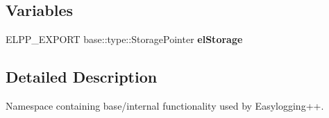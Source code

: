 \subsection*{Variables}
\begin{DoxyCompactItemize}
\item 
E\+L\+P\+P\+\_\+\+E\+X\+P\+O\+RT base\+::type\+::\+Storage\+Pointer {\bfseries el\+Storage}\hypertarget{namespaceel_1_1base_a0ec6b7a1bd89ad58dadc10f190142018}{}\label{namespaceel_1_1base_a0ec6b7a1bd89ad58dadc10f190142018}

\end{DoxyCompactItemize}


\subsection{Detailed Description}
Namespace containing base/internal functionality used by Easylogging++. 